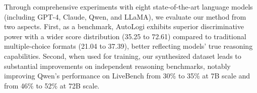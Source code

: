 Through comprehensive experiments with eight state-of-the-art language models (including GPT-4, Claude, Qwen, and LLaMA), we evaluate our method from two aspects. First, as a benchmark, AutoLogi exhibits superior discriminative power with a wider score distribution (35.25 to 72.61) compared to traditional multiple-choice formats (21.04 to 37.39), better reflecting models' true reasoning capabilities. Second, when used for training, our synthesized dataset leads to substantial improvements on independent reasoning benchmarks, notably improving Qwen's performance on LiveBench from 30\% to 35\% at 7B scale and from 46\% to 52\% at 72B scale.

